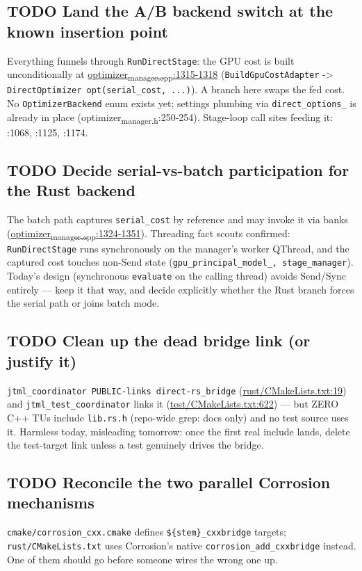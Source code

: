 \documentclass[11pt]{article}
\begin{document}
\subsection{{\bfseries\sffamily TODO} Land the A/B backend switch at the known insertion point}
\label{sec:org8c62f15}
Everything funnels through \texttt{RunDirectStage}: the GPU cost is built
unconditionally at \href{src/coordinator/optimizer\_manager.cpp}{optimizer\textsubscript{manager.cpp}:1315-1318}
(\texttt{BuildGpuCostAdapter} -> \texttt{DirectOptimizer opt(serial\_cost, ...)}). A
branch here swaps the fed cost. No \texttt{OptimizerBackend} enum exists yet;
settings plumbing via \texttt{direct\_options\_} is already in place
(optimizer\textsubscript{manager.h}:250-254). Stage-loop call sites feeding it:
:1068, :1125, :1174.
\subsection{{\bfseries\sffamily TODO} Decide serial-vs-batch participation for the Rust backend}
\label{sec:org800310b}
The batch path captures \texttt{serial\_cost} by reference and may invoke it via
banks (\href{src/coordinator/optimizer\_manager.cpp}{optimizer\textsubscript{manager.cpp}:1324-1351}). Threading fact scouts
confirmed: \texttt{RunDirectStage} runs synchronously on the manager's worker
QThread, and the captured cost touches non-Send state
(\texttt{gpu\_principal\_model\_, stage\_manager}). Today's design (synchronous
\texttt{evaluate} on the calling thread) avoids Send/Sync entirely — keep it
that way, and decide explicitly whether the Rust branch forces the serial
path or joins batch mode.
\subsection{{\bfseries\sffamily TODO} Clean up the dead bridge link (or justify it)}
\label{sec:org18219fe}
\texttt{jtml\_coordinator PUBLIC-links direct-rs\_bridge}
(\href{rust/CMakeLists.txt}{rust/CMakeLists.txt:19}) and \texttt{jtml\_test\_coordinator}
links it (\href{test/CMakeLists.txt}{test/CMakeLists.txt:622}) — but ZERO C++ TUs include \texttt{lib.rs.h}
(repo-wide grep: docs only) and no test source uses it. Harmless today,
misleading tomorrow: once the first real include lands, delete the
test-target link unless a test genuinely drives the bridge.
\subsection{{\bfseries\sffamily TODO} Reconcile the two parallel Corrosion mechanisms}
\label{sec:org5e8fb5e}
\texttt{cmake/corrosion\_cxx.cmake} defines \texttt{\$\{stem\}\_cxxbridge} targets;
\texttt{rust/CMakeLists.txt} uses Corrosion's native \texttt{corrosion\_add\_cxxbridge}
instead. One of them should go before someone wires the wrong one up.
\end{document}
